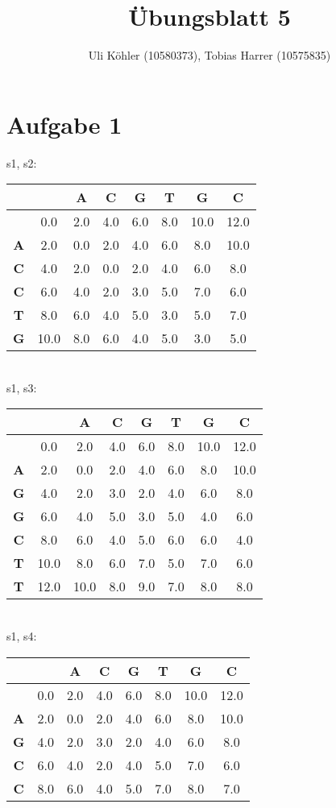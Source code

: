 \documentclass[a4paper,10pt,oneside,leqno]{scrartcl}
\title{Übungsblatt 5}
\author{Uli Köhler (10580373), Tobias Harrer (10575835)}
\begin{document}
\maketitle

\section*{Aufgabe 1}%
s1, s2: \\
\begin{tabular}{c|ccccccc}
& \textbf{ } & \textbf{A} & \textbf{C} & \textbf{G} & \textbf{T} & \textbf{G} & \textbf{C}\\\hline
\textbf{ } & 0.0 & 2.0 & 4.0 & 6.0 & 8.0 & 10.0 & 12.0\\
\textbf{A} & 2.0 & 0.0 & 2.0 & 4.0 & 6.0 & 8.0 & 10.0\\
\textbf{C} & 4.0 & 2.0 & 0.0 & 2.0 & 4.0 & 6.0 & 8.0\\
\textbf{C} & 6.0 & 4.0 & 2.0 & 3.0 & 5.0 & 7.0 & 6.0\\
\textbf{T} & 8.0 & 6.0 & 4.0 & 5.0 & 3.0 & 5.0 & 7.0\\
\textbf{G} & 10.0 & 8.0 & 6.0 & 4.0 & 5.0 & 3.0 & 5.0\\
\end{tabular}
\\[2mm]s1, s3: \\
\begin{tabular}{c|ccccccc}
& \textbf{ } & \textbf{A} & \textbf{C} & \textbf{G} & \textbf{T} & \textbf{G} & \textbf{C}\\\hline
\textbf{ } & 0.0 & 2.0 & 4.0 & 6.0 & 8.0 & 10.0 & 12.0\\
\textbf{A} & 2.0 & 0.0 & 2.0 & 4.0 & 6.0 & 8.0 & 10.0\\
\textbf{G} & 4.0 & 2.0 & 3.0 & 2.0 & 4.0 & 6.0 & 8.0\\
\textbf{G} & 6.0 & 4.0 & 5.0 & 3.0 & 5.0 & 4.0 & 6.0\\
\textbf{C} & 8.0 & 6.0 & 4.0 & 5.0 & 6.0 & 6.0 & 4.0\\
\textbf{T} & 10.0 & 8.0 & 6.0 & 7.0 & 5.0 & 7.0 & 6.0\\
\textbf{T} & 12.0 & 10.0 & 8.0 & 9.0 & 7.0 & 8.0 & 8.0\\
\end{tabular}
\\[2mm]s1, s4: \\
\begin{tabular}{c|ccccccc}
& \textbf{ } & \textbf{A} & \textbf{C} & \textbf{G} & \textbf{T} & \textbf{G} & \textbf{C}\\\hline
\textbf{ } & 0.0 & 2.0 & 4.0 & 6.0 & 8.0 & 10.0 & 12.0\\
\textbf{A} & 2.0 & 0.0 & 2.0 & 4.0 & 6.0 & 8.0 & 10.0\\
\textbf{G} & 4.0 & 2.0 & 3.0 & 2.0 & 4.0 & 6.0 & 8.0\\
\textbf{C} & 6.0 & 4.0 & 2.0 & 4.0 & 5.0 & 7.0 & 6.0\\
\textbf{C} & 8.0 & 6.0 & 4.0 & 5.0 & 7.0 & 8.0 & 7.0\\
\end{tabular}
\end{document}
